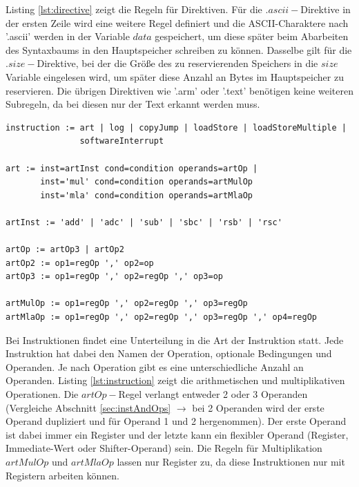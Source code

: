 \documentclass[a4paper, 11pt, onecolumn]{article}
\begin{document}
Listing \ref{lst:directive} zeigt die Regeln für Direktiven. Für die $.ascii-$Direktive in der ersten Zeile wird eine weitere Regel definiert und die ASCII-Charaktere nach '.ascii' werden in der Variable $data$ gespeichert, um diese später beim Abarbeiten des Syntaxbaums in den Hauptspeicher schreiben zu können. Dasselbe gilt für die $.size-$Direktive, bei der die Größe des zu reservierenden Speichers in die $size$ Variable eingelesen wird, um später diese Anzahl an Bytes im Hauptspeicher zu reservieren. Die übrigen Direktiven wie '.arm' oder '.text' benötigen keine weiteren Subregeln, da bei diesen nur der Text erkannt werden muss.\\

\begin{lstlisting}[basicstyle=\ttfamily\footnotesize, backgroundcolor=\color{backcolour}, caption={Instruktionen}, captionpos=b, label={lst:instruction}]
instruction := art | log | copyJump | loadStore | loadStoreMultiple |
               softwareInterrupt
               
art := inst=artInst cond=condition operands=artOp |
       inst='mul' cond=condition operands=artMulOp
       inst='mla' cond=condition operands=artMlaOp

artInst := 'add' | 'adc' | 'sub' | 'sbc' | 'rsb' | 'rsc'

artOp := artOp3 | artOp2
artOp2 := op1=regOp ',' op2=op
artOp3 := op1=regOp ',' op2=regOp ',' op3=op

artMulOp := op1=regOp ',' op2=regOp ',' op3=regOp
artMlaOp := op1=regOp ',' op2=regOp ',' op3=regOp ',' op4=regOp
\end{lstlisting}

Bei Instruktionen findet eine Unterteilung in die Art der Instruktion statt. Jede Instruktion hat dabei den Namen der Operation, optionale Bedingungen und Operanden. Je nach Operation gibt es eine unterschiedliche Anzahl an Operanden. Listing \ref{lst:instruction} zeigt die arithmetischen und multiplikativen Operationen. Die $artOp-$Regel verlangt entweder 2 oder 3 Operanden (Vergleiche Abschnitt \ref{sec:instAndOps} $\rightarrow$ bei 2 Operanden wird der erste Operand dupliziert und für Operand 1 und 2 hergenommen). Der erste Operand ist dabei immer ein Register und der letzte kann ein flexibler Operand (Register, Immediate-Wert oder Shifter-Operand) sein. Die Regeln für Multiplikation $artMulOp$ und $artMlaOp$ lassen nur Register zu, da diese Instruktionen nur mit Registern arbeiten können.\\
\end{document}
